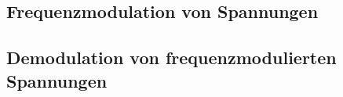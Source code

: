 









\subsection{Frequenzmodulation von Spannungen}






\subsection{Demodulation von frequenzmodulierten Spannungen}


